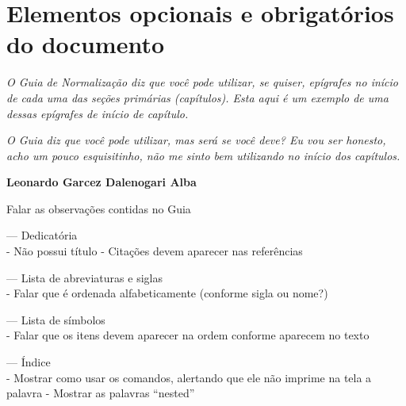 \chapter{Elementos opcionais e obrigatórios do documento}
\hspace{\fill}
\begin{minipage}{6cm}
    \begin{singlespace} %
        \textit{O Guia de Normalização diz que você pode utilizar, se quiser, epígrafes no início de cada uma das seções primárias (capítulos). Esta aqui é um exemplo de uma dessas epígrafes de início de capítulo.} 
        
        \textit{O Guia diz que você pode utilizar, mas será se você deve? Eu vou ser honesto, acho um pouco esquisitinho, não me sinto bem utilizando no início dos capítulos.}
        
        \textbf{Leonardo Garcez Dalenogari Alba}
    \end{singlespace}
\end{minipage}

Falar as observações contidas no Guia

--- Dedicatória\\
    - Não possui título
    - Citações devem aparecer nas referências

--- Lista de abreviaturas e siglas\\
    - Falar que é ordenada alfabeticamente (conforme sigla ou nome?)

--- Lista de símbolos\\
    - Falar que os itens devem aparecer na ordem conforme aparecem no texto

--- Índice\\
    - Mostrar como usar os comandos, alertando que ele não imprime na tela a palavra
    - Mostrar as palavras ``nested''
    